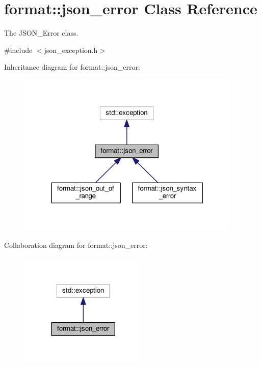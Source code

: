 \hypertarget{classformat_1_1json__error}{}\section{format\+:\+:json\+\_\+error Class Reference}
\label{classformat_1_1json__error}


The J\+S\+O\+N\+\_\+\+Error class.  




{\ttfamily \#include $<$json\+\_\+exception.\+h$>$}



Inheritance diagram for format\+:\+:json\+\_\+error\+:
\nopagebreak
\begin{figure}[H]
\begin{center}
\leavevmode
\includegraphics[width=302pt]{classformat_1_1json__error__inherit__graph}
\end{center}
\end{figure}


Collaboration diagram for format\+:\+:json\+\_\+error\+:
\nopagebreak
\begin{figure}[H]
\begin{center}
\leavevmode
\includegraphics[width=173pt]{classformat_1_1json__error__coll__graph}
\end{center}
\end{figure}
